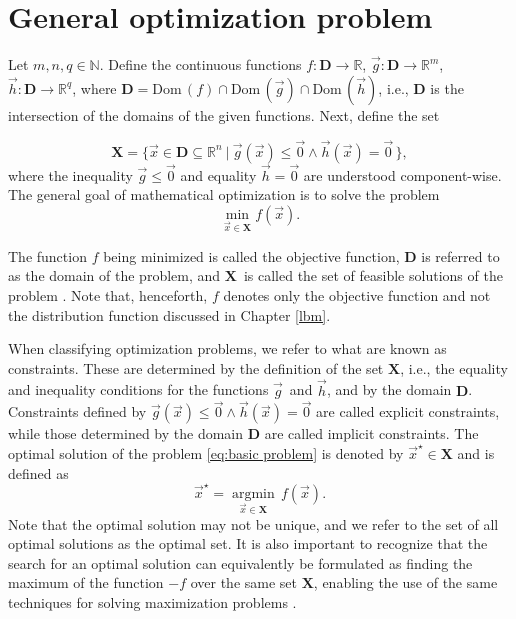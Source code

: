 \section{General optimization problem}

Let $m, n, q \in \mathbb{N}$. Define the continuous functions $f : \mathbf{D} \rightarrow \mathbb{R}$, $ \vec{g} : \mathbf{D} \rightarrow \mathbb{R}^m$, $ \vec{h} : \mathbf{D} \rightarrow \mathbb{R}^q $, where $ \mathbf{D} = \mathrm{Dom} \, (f) \cap \mathrm{Dom} \, (\vec{g}) \cap \mathrm{Dom} \, (\vec{h})$, i.e., $ \mathbf{D} $ is the intersection of the domains of the given functions. Next, define the set

\begin{equation}\label{eq:feasible solution}
	\mathbf{X} = \big\{ \vec{x} \in \mathbf{D} \subseteq \mathbb{R}^n \ | \ \vec{g} (\vec{x}) \leq \vec{0} \wedge \vec{h} (\vec{x}) = \vec{0} \, \big\},
\end{equation}
where the inequality $ \vec{g} \leq \vec{0} $ and equality $ \vec{h} = \vec{0} $ are understood component-wise. The general goal of mathematical optimization is to solve the problem
\begin{equation}\label{eq:basic problem}
	\min_{\vec{x} \in \mathbf{X}} f(\vec{x}).
\end{equation}

The function $f$ being minimized is called the objective function, $\mathbf{D}$ is referred to as the domain of the problem, and $\mathbf{X}$~is called the set of feasible solutions of the problem \cite{Bert}. Note that, henceforth, $f$ denotes only the objective function and not the distribution function discussed in Chapter \ref{lbm}.

When classifying optimization problems, we refer to what are known as constraints. These are determined by the definition of the set $ \mathbf{X} $, i.e., the equality and inequality conditions for the functions $ \vec{g} $~and $ \vec{h} $, and by the domain $ \mathbf{D} $. Constraints defined by $ \vec{g} (\vec{x}) \leq \vec{0} \wedge \vec{h} (\vec{x}) = \vec{0} $ are called explicit constraints, while those determined by the domain $ \mathbf{D} $ are called implicit constraints.
\newpage
The optimal solution of the problem \eqref{eq:basic problem} is denoted by $ \vec{x}^{\star} \in \mathbf{X} $ and is defined as
\begin{equation}
	\vec{x}^{\star} = \operatorname*{argmin}_{\vec{x} \in \mathbf{X}} \, f(\vec{x}).
\end{equation}
Note that the optimal solution may not be unique, and we refer to the set of all optimal solutions as the optimal set. It is also important to recognize that the search for an optimal solution can equivalently be formulated as finding the maximum of the function $ -f$ over the same set $ \mathbf{X}$, enabling the use of the same techniques for solving maximization problems \cite{Bert, non-linear-textbook}.